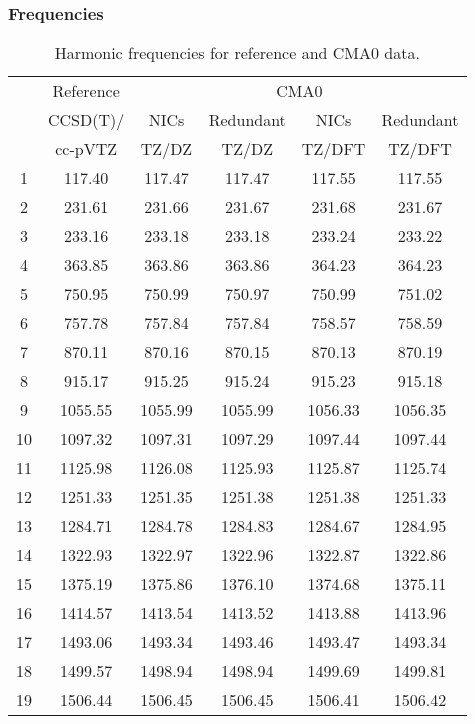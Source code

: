 \documentclass[10pt,oneside]{article}
\begin{document}
\begin{table}[h!]
\subsubsection*{Frequencies}
\centering
\caption{Harmonic frequencies for reference and CMA0 data.}
\begin{tabular}{cccccc}
\toprule
{} & Reference & \multicolumn{4}{c}{CMA0} \\
{} &  CCSD(T)/ &    NICs &  Redundant &    NICs & Redundant \\
{} &   cc-pVTZ &   TZ/DZ &      TZ/DZ &  TZ/DFT &    TZ/DFT \\
\midrule
1  &    117.40 &  117.47 &     117.47 &  117.55 &    117.55 \\
2  &    231.61 &  231.66 &     231.67 &  231.68 &    231.67 \\
3  &    233.16 &  233.18 &     233.18 &  233.24 &    233.22 \\
4  &    363.85 &  363.86 &     363.86 &  364.23 &    364.23 \\
5  &    750.95 &  750.99 &     750.97 &  750.99 &    751.02 \\
6  &    757.78 &  757.84 &     757.84 &  758.57 &    758.59 \\
7  &    870.11 &  870.16 &     870.15 &  870.13 &    870.19 \\
8  &    915.17 &  915.25 &     915.24 &  915.23 &    915.18 \\
9  &   1055.55 & 1055.99 &    1055.99 & 1056.33 &   1056.35 \\
10 &   1097.32 & 1097.31 &    1097.29 & 1097.44 &   1097.44 \\
11 &   1125.98 & 1126.08 &    1125.93 & 1125.87 &   1125.74 \\
12 &   1251.33 & 1251.35 &    1251.38 & 1251.38 &   1251.33 \\
13 &   1284.71 & 1284.78 &    1284.83 & 1284.67 &   1284.95 \\
14 &   1322.93 & 1322.97 &    1322.96 & 1322.87 &   1322.86 \\
15 &   1375.19 & 1375.86 &    1376.10 & 1374.68 &   1375.11 \\
16 &   1414.57 & 1413.54 &    1413.52 & 1413.88 &   1413.96 \\
17 &   1493.06 & 1493.34 &    1493.46 & 1493.47 &   1493.34 \\
18 &   1499.57 & 1498.94 &    1498.94 & 1499.69 &   1499.81 \\
19 &   1506.44 & 1506.45 &    1506.45 & 1506.41 &   1506.42 \\

\end{tabular}
\end{table}
\end{document}
